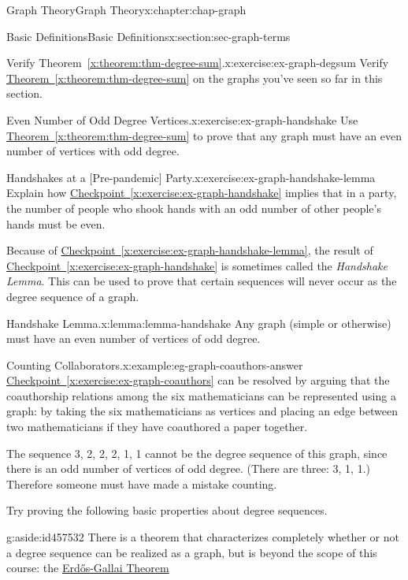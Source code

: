 \documentclass[oneside,10pt,]{book}
\newcommand{\xreffont}{\relax}
\numberwithin{equation}{section}
\begin{document}
\begin{chapterptx}{Graph Theory}{}{Graph Theory}{}{}{x:chapter:chap-graph}
\begin{sectionptx}{Basic Definitions}{}{Basic Definitions}{}{}{x:section:sec-graph-terms}
\begin{inlineexercise}{Verify Theorem~{\xreffont\ref*{x:theorem:thm-degree-sum}}.}{x:exercise:ex-graph-degsum}
Verify \hyperref[x:theorem:thm-degree-sum]{Theorem~{\xreffont\ref{x:theorem:thm-degree-sum}}} on the graphs you've seen so far in this section.%
\end{inlineexercise}
\begin{inlineexercise}{Even Number of Odd Degree Vertices.}{x:exercise:ex-graph-handshake}%
Use \hyperref[x:theorem:thm-degree-sum]{Theorem~{\xreffont\ref{x:theorem:thm-degree-sum}}} to prove that any graph must have an even number of vertices with odd degree.%
\end{inlineexercise}
\begin{inlineexercise}{Handshakes at a [Pre-pandemic] Party.}{x:exercise:ex-graph-handshake-lemma}%
Explain how \hyperref[x:exercise:ex-graph-handshake]{Checkpoint~{\xreffont\ref{x:exercise:ex-graph-handshake}}} implies that in a party, the number of people who shook hands with an odd number of other people's hands must be even.%
\end{inlineexercise}
Because of \hyperref[x:exercise:ex-graph-handshake-lemma]{Checkpoint~{\xreffont\ref{x:exercise:ex-graph-handshake-lemma}}}, the result of \hyperref[x:exercise:ex-graph-handshake]{Checkpoint~{\xreffont\ref{x:exercise:ex-graph-handshake}}} is sometimes called the \emph{Handshake Lemma}. This can be used to prove that certain sequences will never occur as the degree sequence of a graph.%
\begin{lemma}{Handshake Lemma.}{}{x:lemma:lemma-handshake}%
Any graph (simple or otherwise) must have an even number of vertices of odd degree.%
\end{lemma}
\begin{example}{Counting Collaborators.}{x:example:eg-graph-coauthors-answer}%
\hyperref[x:exercise:ex-graph-coauthors]{Checkpoint~{\xreffont\ref{x:exercise:ex-graph-coauthors}}} can be resolved by arguing that the coauthorship relations among the six mathematicians can be represented using a graph: by taking the six mathematicians as vertices and placing an edge between two mathematicians if they have coauthored a paper together.%
\par
The sequence 3, 2, 2, 2, 1, 1 cannot be the degree sequence of this graph, since there is an odd number of vertices of odd degree. (There are three: 3, 1, 1.) Therefore someone must have made a mistake counting.%
\end{example}
Try proving the following basic properties about degree sequences.%
\begin{aside}{}{g:aside:id457532}%
There is a theorem that characterizes completely whether or not a degree sequence can be realized as a graph, but is beyond the scope of this course: the \href{https://en.wikipedia.org/wiki/Erd\%C5\%91s\%E2\%80\%93Gallai_theorem}{Erdős-Gallai Theorem}%

\end{aside}
\end{sectionptx}
\end{chapterptx}
\end{document}
